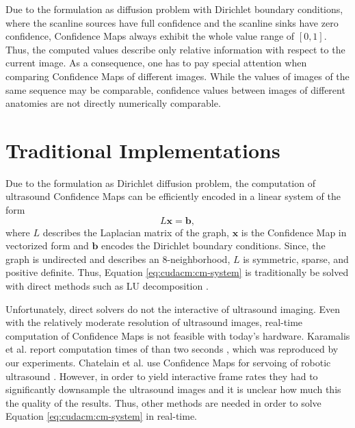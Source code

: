 Due to the formulation as diffusion problem with Dirichlet boundary conditions, where the scanline sources have full confidence and the scanline sinks have zero confidence, Confidence Maps always exhibit the whole value range of $[0, 1]$.
Thus, the computed values describe only relative information with respect to the current image.
As a consequence, one has to pay special attention when comparing Confidence Maps of different images.
While the values of images of the same sequence may be comparable, confidence values between images of different anatomies are not directly numerically comparable.


\section{Traditional Implementations}

Due to the formulation as Dirichlet diffusion problem, the computation of ultrasound Confidence Maps can be efficiently encoded in a linear system of the form
\begin{equation}
	L \mathbf{x} = \mathbf{b},
	\label{eq:cudacm:cm-system}
\end{equation}
where $L$ describes the Laplacian matrix of the graph, $\mathbf{x}$ is the Confidence Map in vectorized form and $\mathbf{b}$ encodes the Dirichlet boundary conditions.
Since, the graph is undirected and describes an 8-neighborhood, $L$ is symmetric, sparse, and positive definite.
Thus, Equation \ref{eq:cudacm:cm-system} is traditionally be solved with direct methods such as LU decomposition \cite{Karamalis:2012:ConfidenceMaps}.

Unfortunately, direct solvers do not  the interactive  of ultrasound imaging.
Even with the relatively moderate resolution of ultrasound images, real-time computation of Confidence Maps is not feasible with today's hardware.
Karamalis et al. report computation times of  than two seconds \cite{Karamalis:2012:ConfidenceMaps}, which was reproduced by our experiments.
Chatelain et al. use Confidence Maps for servoing of robotic ultrasound \cite{Chatelain:2015:UltrasoundServoing}.
However, in order to yield interactive frame rates they had to significantly downsample the ultrasound images and it is unclear how much this  the quality of the results.
Thus, other methods are needed in order to solve Equation \ref{eq:cudacm:cm-system} in real-time.


